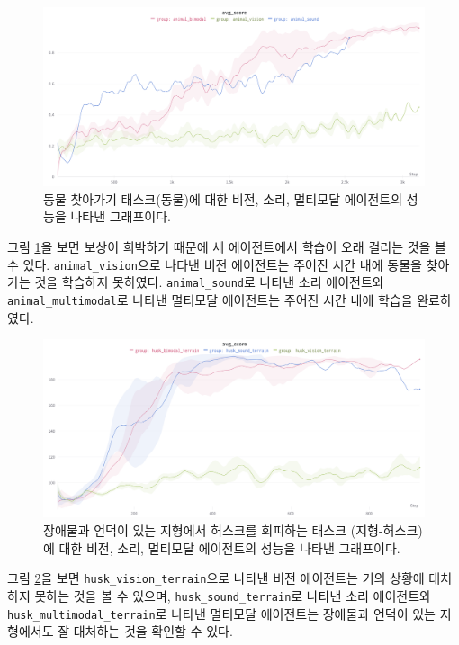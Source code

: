 \documentclass[oneside, under, ko]{snuthesis}
\begin{document}
\begin{figure}[H]
    \centering
    \includegraphics[width=\textwidth]{animal.png}
    \caption{동물 찾아가기 태스크(동물)에 대한 비전, 소리, 멀티모달 에이전트의 성능을 나타낸 그래프이다.}
    \label{fig:animal}
\end{figure}
그림 \ref{fig:animal}을 보면 보상이 희박하기 때문에 세 에이전트에서 학습이 오래 걸리는 것을 볼 수 있다. \lstinline{animal_vision}으로 나타낸 비전 에이전트는 주어진 시간 내에 동물을 찾아가는 것을 학습하지 못하였다. \lstinline{animal_sound}로 나타낸 소리 에이전트와 \lstinline{animal_multimodal}로 나타낸 멀티모달 에이전트는 주어진 시간 내에 학습을 완료하였다.

\begin{figure}[H]
    \centering
    \includegraphics[width=\textwidth]{husk_terrain.png}
    \caption{장애물과 언덕이 있는 지형에서 허스크를 회피하는 태스크 (지형-허스크)에 대한 비전, 소리, 멀티모달 에이전트의 성능을 나타낸 그래프이다. }
    \label{fig:husk_terrain}
\end{figure}
그림 \ref{fig:husk_terrain}을 보면 \lstinline{husk_vision_terrain}으로 나타낸 비전 에이전트는 거의 상황에 대처하지 못하는 것을 볼 수 있으며, \lstinline{husk_sound_terrain}로 나타낸 소리 에이전트와 \lstinline{husk_multimodal_terrain}로 나타낸 멀티모달 에이전트는 장애물과 언덕이 있는 지형에서도 잘 대처하는 것을 확인할 수 있다.
\end{document}
